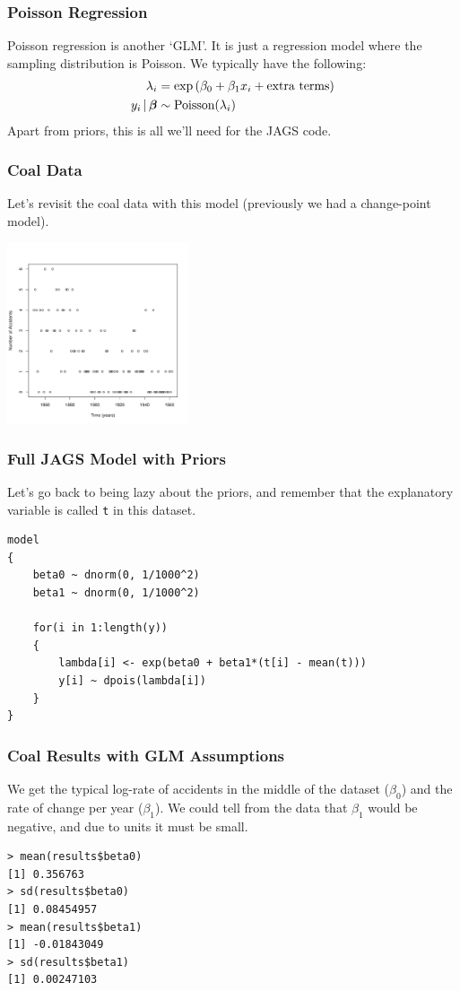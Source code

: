 \documentclass{beamer}
\newcommand{\given}{\,|\,}
\begin{document}
\begin{frame}
\frametitle{Poisson Regression}
Poisson regression is another `GLM'. It is just a regression model where
the sampling distribution is Poisson. We typically have the following:
\begin{align}
\lambda_i &= \exp\left(\beta_0 + \beta_1 x_i + \textnormal{extra terms}\right) \\
y_i \given \boldsymbol{\beta} &\sim \textnormal{Poisson}(\lambda_i)
\end{align}
Apart from priors, this is all we'll need for the JAGS code.

\end{frame}



\begin{frame}
\frametitle{Coal Data}
Let's revisit the coal data with this model (previously we had a change-point
model).

\begin{center}
\includegraphics[width=0.4\textwidth]{images/coal.pdf}
\end{center}

\end{frame}


\begin{frame}[fragile]
\frametitle{Full JAGS Model with Priors}
Let's go back to being lazy about the priors, and remember that the
explanatory variable is called \texttt{t} in this dataset.
\footnotesize
\begin{verbatim}
model
{
    beta0 ~ dnorm(0, 1/1000^2)
    beta1 ~ dnorm(0, 1/1000^2)

    for(i in 1:length(y))
    {
        lambda[i] <- exp(beta0 + beta1*(t[i] - mean(t)))
        y[i] ~ dpois(lambda[i])
    }
}
\end{verbatim}

\end{frame}


\begin{frame}[fragile]
\frametitle{Coal Results with GLM Assumptions}
We get the typical log-rate of accidents in the middle of the dataset
($\beta_0$) and the rate of change per year ($\beta_1$). We could tell from
the data that $\beta_1$ would be negative, and due to units it must be small.
\footnotesize
\begin{verbatim}
> mean(results$beta0)
[1] 0.356763
> sd(results$beta0)
[1] 0.08454957
> mean(results$beta1)
[1] -0.01843049
> sd(results$beta1)
[1] 0.00247103
\end{verbatim}

\end{frame}
\end{document}
